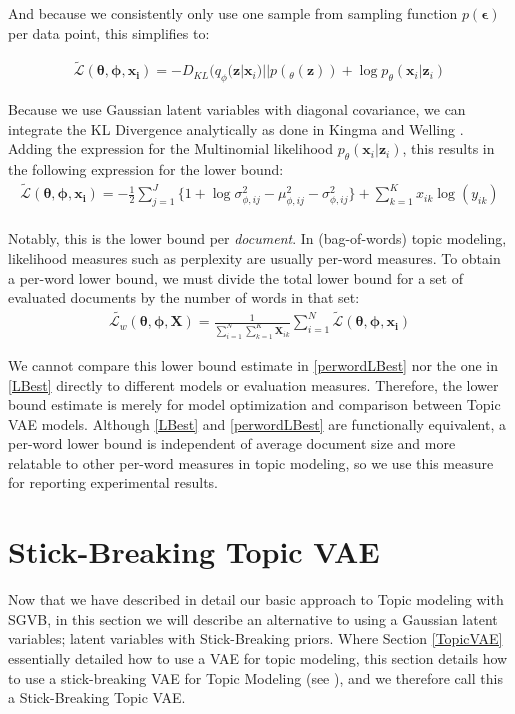 \documentclass{report}
\begin{document}
And because we consistently only use one sample from sampling function $p(\boldsymbol{\epsilon})$ per data point, this simplifies to:

\begin{align}\label{lb_summary}
\tilde{\mathcal{L}}(\boldsymbol{\theta}, \boldsymbol{\phi}, \mathbf{x_i}) = -D_{KL}(q_\phi (\mathbf{z}|\mathbf{x}_i)||p(_\theta(\mathbf{z}))  + \log p_\theta(\mathbf{x}_i|\mathbf{z}_i)
\end{align}

Because we use Gaussian latent variables with diagonal covariance, we can integrate the KL Divergence analytically as done in Kingma and Welling \cite{kingma2013auto}. Adding the expression for the Multinomial likelihood $p_\theta(\mathbf{x}_i|\mathbf{z}_i)$, this results in the following expression for the lower bound:
\begin{align}\label{LBest}
\tilde{\mathcal{L}}(\boldsymbol{\theta}, \boldsymbol{\phi}, \mathbf{x_i}) = - \frac{1}{2}\sum\limits_{j=1}^{J}\{1+\log \sigma_{\phi ,ij}^2 - \mu_{\phi,ij}^2 - \sigma_{\phi ,ij}^2\}  + 
\sum_{k=1}^K x_{ik} \log (y_{ik})
\end{align}
\\
Notably, this is the lower bound per \textit{document}. In (bag-of-words) topic modeling, likelihood measures such as perplexity are usually per-word measures. To obtain a per-word lower bound, we must divide the total lower bound for a set of evaluated documents by the number of words in that set: 
\begin{align}\label{perwordLBest}
\tilde{\mathcal{L}_w}(\boldsymbol{\theta}, \boldsymbol{\phi}, \mathbf{X}) = \frac{1}{\sum\limits_{i=1}^{N}\sum\limits_{k=1}^{K}\mathbf{X}_{ik}}\sum\limits_{i=1}^N \tilde{\mathcal{L}}(\boldsymbol{\theta}, \boldsymbol{\phi}, \mathbf{x_i})
\end{align}

We cannot compare this lower bound estimate in \ref{perwordLBest} nor the one in \ref{LBest} directly to different models or evaluation measures. Therefore, the lower bound estimate is merely for model optimization and comparison between Topic VAE models. Although \ref{LBest} and \ref{perwordLBest} are functionally equivalent, a per-word lower bound is independent of average document size and more relatable to other per-word measures in topic modeling, so we use this measure for reporting experimental results.



\section{Stick-Breaking Topic VAE}\label{sbtvae}
Now that we have described in detail our basic approach to Topic modeling with SGVB, in this section we will describe an alternative to using a Gaussian latent variables; latent variables with Stick-Breaking priors. Where Section \ref{TopicVAE} essentially detailed how to use a VAE for topic modeling, this section details how to use a stick-breaking VAE for Topic Modeling (see \cite{nalisnick2016deep}), and we therefore call this a Stick-Breaking Topic VAE.\\
\end{document}

